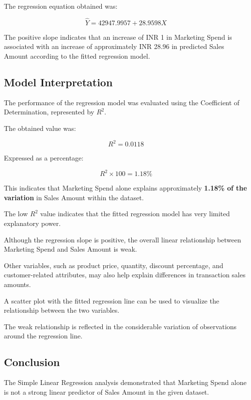 \documentclass[12pt,a4paper]{report}
\begin{document}
The regression equation obtained was:

\[
\boxed{
\hat{Y} = 42947.9957 + 28.9598X
}
\]

The positive slope indicates that
an increase of INR 1 in Marketing
Spend is associated with an increase
of approximately INR 28.96 in
predicted Sales Amount according
to the fitted regression model.


\subsection{Model Interpretation}

The performance of the regression
model was evaluated using the
Coefficient of Determination,
represented by $R^2$.

The obtained value was:

\[
R^2 = 0.0118
\]

Expressed as a percentage:

\[
R^2 \times 100 = 1.18\%
\]

This indicates that Marketing Spend
alone explains approximately
\textbf{1.18\% of the variation}
in Sales Amount within the dataset.

The low $R^2$ value indicates
that the fitted regression model
has very limited explanatory power.

Although the regression slope
is positive, the overall linear
relationship between Marketing
Spend and Sales Amount is weak.

Other variables, such as product
price, quantity, discount percentage,
and customer-related attributes,
may also help explain differences
in transaction sales amounts.

A scatter plot with the fitted
regression line can be used to
visualize the relationship between
the two variables.

The weak relationship is reflected
in the considerable variation of
observations around the regression
line.

\subsection{Conclusion}

The Simple Linear Regression analysis
demonstrated that Marketing Spend
alone is not a strong linear predictor
of Sales Amount in the given dataset.
\end{document}
